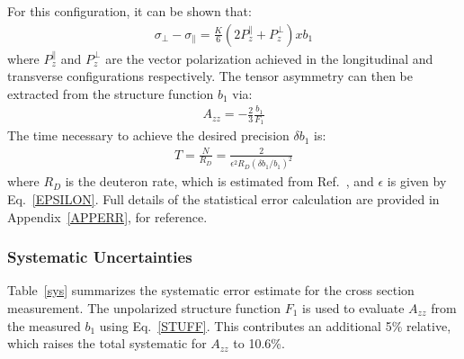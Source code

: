 For this configuration, it can be shown that:
%
\begin{eqnarray}
 \sigma_{\perp} - \sigma_{\parallel} = \frac{K}{6} (2 P_z^{\parallel} + P_z^{\perp}) x b_1
\label{MAIN}
\end{eqnarray}
where $P_z^{\parallel}$ and $P_z^{\perp}$ are the vector polarization achieved in the longitudinal and transverse configurations respectively. 
%
The tensor asymmetry can then be extracted from the structure function $b_1$ via:
\begin{eqnarray}
\label{STUFF}
A_{zz} = -\frac{2}{3} \frac{b_1}{F_1} 
\label{Azz}
\end{eqnarray}
The time necessary to achieve the desired precision $\delta b_1$ is:
\begin{eqnarray}
T = \frac{N}{R_D} = \frac{2}{\epsilon^2 R_D (\delta b_1 / b_1)^2}
\label{none}
\end{eqnarray}
%
where $R_D$ is the deuteron rate, which is estimated from Ref.~\cite{Martin:2009iq}, and $\epsilon$ is given  by Eq.~\ref{EPSILON}. 
Full details of the statistical error calculation are provided in Appendix~\ref{APPERR}, for reference.


%



\subsubsection{Systematic Uncertainties}
Table~\ref{sys} summarizes the systematic error estimate for the cross section measurement.
The unpolarized structure function
$F_1$ is used to evaluate $A_{zz}$ from the measured $b_1$  using Eq.~\ref{STUFF}.   This contributes an additional 5\% relative, which raises the total systematic for $A_{zz}$ to 10.6\%.


